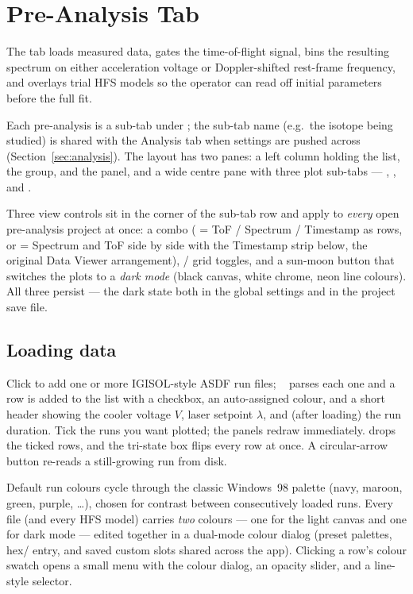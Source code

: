 \section{Pre-Analysis Tab}
\label{sec:preanalysis}

The  tab loads measured data, gates the
time-of-flight signal, bins the resulting spectrum on either
acceleration voltage or Doppler-shifted rest-frame frequency, and
overlays trial HFS models so the operator can read off initial
parameters before the full fit.

Each pre-analysis is a sub-tab under ; the
sub-tab name (e.g.\ the isotope being studied) is shared with the Analysis
tab when settings are pushed across (Section~\ref{sec:analysis}). The
layout has two panes: a left column holding the 
list, the  group, and the  panel,
and a wide centre pane with three plot sub-tabs --- ,
, and .

Three view controls sit in the corner of the sub-tab row and apply to
\emph{every} open pre-analysis project at once: a  combo
( = ToF / Spectrum / Timestamp as rows, or
 = Spectrum and ToF side by side with the
Timestamp strip below, the original Data Viewer arrangement),
 /  grid toggles, and a sun-moon button that switches
the plots to a \emph{dark mode} (black canvas, white chrome, neon
line colours). All three persist --- the dark state both in the
global settings and in the project save file.

\subsection{Loading data}

Click  to add one or more IGISOL-style ASDF run files;
~\cite{clstools} parses each one and a row is added to
the  list with a checkbox, an auto-assigned colour,
and a short header showing the cooler voltage $V$, laser setpoint
$\lambda$, and (after loading) the run duration. Tick the runs you
want plotted; the panels redraw immediately. 
drops the ticked rows, and the tri-state  box flips
every row at once. A circular-arrow button re-reads a still-growing
run from disk.

Default run colours cycle through the classic Windows~98 palette
(navy, maroon, green, purple, \dots), chosen for contrast between
consecutively loaded runs. Every file (and every HFS model) carries
\emph{two} colours --- one for the light canvas and one for dark
mode --- edited together in a dual-mode colour dialog (preset
palettes, hex/ entry, and saved custom slots shared
across the app). Clicking a row's colour swatch opens a small menu
with the colour dialog, an opacity slider, and a line-style selector.

